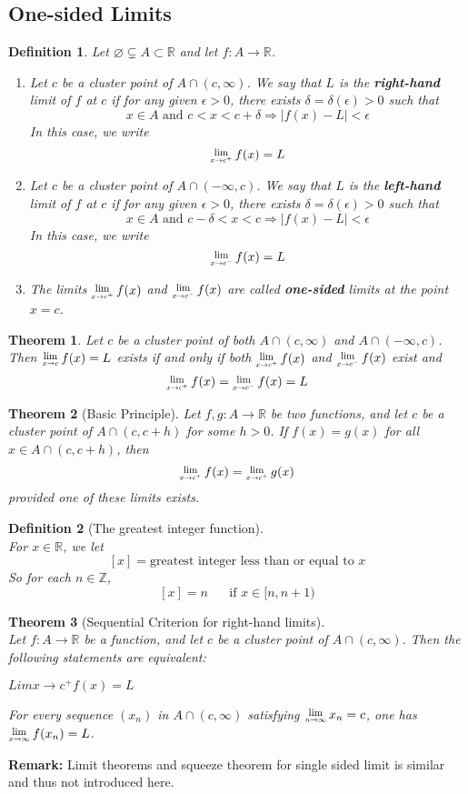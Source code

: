 \documentclass[12pt]{article}
\newcommand{\Lim}[1]{\raisebox{0.5ex}{\scalebox{0.8}{$\displaystyle \lim_{#1}\;$}}}
\newtheorem{definition}{Definition}[section]
\newtheorem{theorem}{Theorem}[section]
\theoremstyle{definition}
\begin{document}
\subsection{One-sided Limits}
\begin{definition}\normalfont
Let $\varnothing\subsetneq A\subset \mathbb{R}$ and let $f:A\to\mathbb{R}$.
\begin{enumerate}
\item Let $c$ be a cluster point of $A\cap(c,\infty)$. We say that $L$ is the \textbf{right-hand} limit of $f$ at $c$ if for any given $\epsilon>0$, there exists $\delta=\delta(\epsilon)>0$ such that
\[
x\in A \text{ and }c<x<c+\delta\Rightarrow |f(x)-L|<\epsilon
\]
In this case, we write
\[
\Lim{x\to c^+}f(x)=L
\]
\item Let $c$ be a cluster point of $A\cap (-\infty,c)$. We say that $L$ is the \textbf{left-hand} limit of $f$ at $c$ if for any  given $\epsilon>0$, there exists $\delta=\delta(\epsilon)>0$ such that
\[
x\in A \text{ and }c-\delta<x<c\Rightarrow |f(x)-L|<\epsilon
\]
In this case, we write
\[
\Lim{x\to c^-}f(x)=L
\]
\item The limits $\Lim{x\to c^+}f(x)$ and $\Lim{x\to c^-}f(x)$ are called \textbf{one-sided} limits at the point $x=c$. 
\end{enumerate}
\end{definition}
\begin{theorem}\normalfont Let $c$ be a cluster point of both $A\cap (c,\infty)$ and $A\cap (-\infty,c)$. Then $\Lim{x\to c}f(x)=L$ exists if and only if both $\Lim{x\to c^+}f(x)$ and $\Lim{x\to c^-}f(x)$ exist and 
\[
\Lim{x\to c^+}f(x)=\Lim{x\to c^-}f(x)=L 
\]
\end{theorem}
\begin{theorem}[Basic Principle]\normalfont Let $f,g:A\to \mathbb{R}$ be two functions, and let $c$ be a cluster point of $A\cap (c,c+h)$ for some $h>0$. If $f(x)=g(x)$ for all $x\in A\cap (c,c+h)$, then
\[
\Lim{x\to c^+}f(x)=\Lim{x\to c^+}g(x)
\] 
provided one of these limits exists.
\end{theorem}
\begin{definition}[The greatest integer function]
\hfill\\\normalfont For $x\in\mathbb{R}$, we let
\[
[x]=\text{greatest integer less than or equal to }x
\]
So for each $n\in\mathbb{Z}$,
\[
[x]=n\;\;\;\;\;\;\text{if }x\in[n,n+1)
\]
\end{definition}
\begin{theorem}[Sequential Criterion for right-hand limits]
\hfill\\\normalfont Let $f:A\to\mathbb{R}$ be a function, and let $c$ be a cluster point of $A\cap(c,\infty)$. Then the following statements are equivalent:
\item $Lim{x\to c^+}f(x)=L$
\item For every sequence $(x_n)$ in $A\cap(c,\infty)$ satisfying $\Lim{n\to\infty}x_n=c$, one has $\Lim{x\to \infty}f(x_n)=L$.
\end{theorem}
\textbf{Remark:} Limit theorems and squeeze theorem for single sided limit is similar and thus not introduced here.
\end{document}
